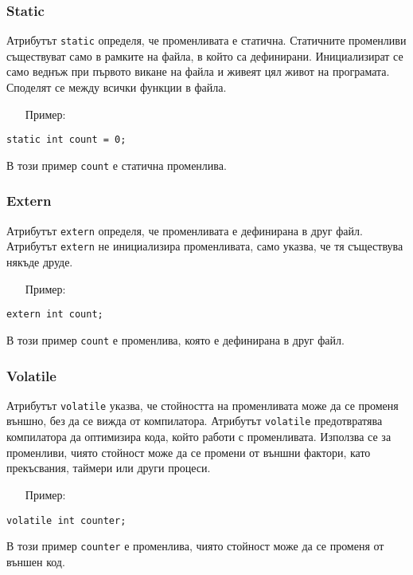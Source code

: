 \documentclass[oneside]{book}
\newcommand*{\code}[1]{\texttt{#1}}
\begin{document}
\subsubsection{Static}
Атрибутът \code{static} определя, че променливата е статична. Статичните променливи съществуват само в рамките на файла, в който са дефинирани. Инициализират се само веднъж при първото викане на файла и живеят цял живот на програмата. Споделят се между всички функции в файла.
\pagebreak
\begin{itemize}\item[Пример:]\end{itemize}
\begin{mdframed}\begin{lstlisting}
static int count = 0;
\end{lstlisting}\end{mdframed}
В този пример \code{count} е статична променлива.

\subsubsection{Extern}
Атрибутът \code{extern} определя, че променливата е дефинирана в друг файл. Атрибутът \code{extern} не инициализира променливата, само указва, че тя съществува някъде друде.

\begin{itemize}\item[Пример:]\end{itemize} 
\begin{mdframed}\begin{lstlisting}
extern int count;
\end{lstlisting}\end{mdframed}
В този пример \code{count} е променлива, която е дефинирана в друг файл.

\subsubsection{Volatile}
Атрибутът \code{volatile} указва, че стойността на променливата може да се променя външно, без да се вижда от компилатора. Атрибутът \code{volatile} предотвратява компилатора да оптимизира кода, който работи с променливата. Използва се за променливи, чиято стойност може да се промени от външни фактори, като прекъсвания, таймери или други процеси.

\begin{itemize}\item[Пример:]\end{itemize} 
\begin{mdframed}\begin{lstlisting}
volatile int counter;
\end{lstlisting}\end{mdframed}
В този пример \code{counter} е променлива, чиято стойност може да се променя от външен код.
\end{document}
